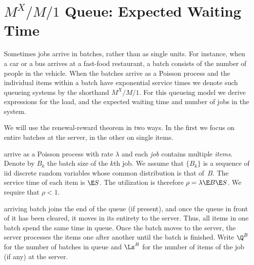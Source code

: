 


\section{$M^X/M/1$ Queue: Expected Waiting Time}
\label{sec:mxm1-queue:-expected}

Sometimes jobs arrive in batches, rather than as single units.
For instance, when a car or a bus arrives at a fast-food restaurant, a batch consists of the number of people in the vehicle.
When the batches arrive as a Poisson process and the individual items within a batch have exponential service times we denote such queueing systems by the shorthand $M^X/M/1$.
For this queueing model we derive expressions for the load, and the expected waiting time and number of jobs in the system.

We will use the renewal-reward theorem in two ways. In the first we focus on entire batches at the server, in the other on single items. 


 arrive as a Poisson process with rate $\lambda$ and each \emph{job} contains multiple \emph{items}.
Denote by $B_k$ the batch size of the $k$th job.
We assume that $\{B_k\}$ is a sequence of iid discrete random variables whose common distribution is that of~$B$.
The service time of each item is $\E S$. The utilization is therefore
$\rho = \lambda \E B \E S$.
We require that $\rho<1$.


 arriving batch joins the end of the queue (if present), and once the queue in front of it has been cleared, it moves in its entirety to the server.
Thus, all items in one batch spend the same time in queue.
Once the batch moves to the server, the server processes the items one after another until the batch is finished.
Write $\Q^B$ for the number of batches in queue and $\Ls^B$ for the number of items of the job (if any) at the server.


